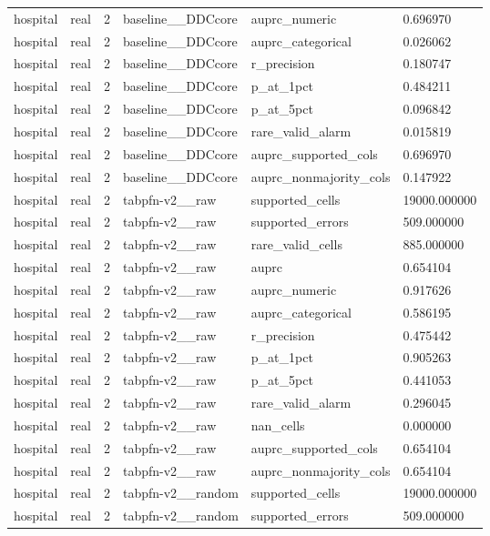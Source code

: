 \begin{tabular}{llllll}
hospital & real & 2 & baseline\_\_DDCcore & auprc\_numeric & 0.696970 \\
hospital & real & 2 & baseline\_\_DDCcore & auprc\_categorical & 0.026062 \\
hospital & real & 2 & baseline\_\_DDCcore & r\_precision & 0.180747 \\
hospital & real & 2 & baseline\_\_DDCcore & p\_at\_1pct & 0.484211 \\
hospital & real & 2 & baseline\_\_DDCcore & p\_at\_5pct & 0.096842 \\
hospital & real & 2 & baseline\_\_DDCcore & rare\_valid\_alarm & 0.015819 \\
hospital & real & 2 & baseline\_\_DDCcore & auprc\_supported\_cols & 0.696970 \\
hospital & real & 2 & baseline\_\_DDCcore & auprc\_nonmajority\_cols & 0.147922 \\
hospital & real & 2 & tabpfn-v2\_\_raw & supported\_cells & 19000.000000 \\
hospital & real & 2 & tabpfn-v2\_\_raw & supported\_errors & 509.000000 \\
hospital & real & 2 & tabpfn-v2\_\_raw & rare\_valid\_cells & 885.000000 \\
hospital & real & 2 & tabpfn-v2\_\_raw & auprc & 0.654104 \\
hospital & real & 2 & tabpfn-v2\_\_raw & auprc\_numeric & 0.917626 \\
hospital & real & 2 & tabpfn-v2\_\_raw & auprc\_categorical & 0.586195 \\
hospital & real & 2 & tabpfn-v2\_\_raw & r\_precision & 0.475442 \\
hospital & real & 2 & tabpfn-v2\_\_raw & p\_at\_1pct & 0.905263 \\
hospital & real & 2 & tabpfn-v2\_\_raw & p\_at\_5pct & 0.441053 \\
hospital & real & 2 & tabpfn-v2\_\_raw & rare\_valid\_alarm & 0.296045 \\
hospital & real & 2 & tabpfn-v2\_\_raw & nan\_cells & 0.000000 \\
hospital & real & 2 & tabpfn-v2\_\_raw & auprc\_supported\_cols & 0.654104 \\
hospital & real & 2 & tabpfn-v2\_\_raw & auprc\_nonmajority\_cols & 0.654104 \\
hospital & real & 2 & tabpfn-v2\_\_random & supported\_cells & 19000.000000 \\
hospital & real & 2 & tabpfn-v2\_\_random & supported\_errors & 509.000000 \\

\end{tabular}
